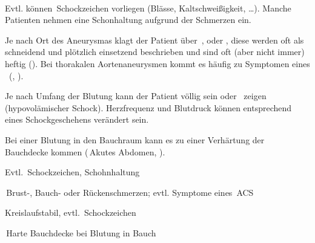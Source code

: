 
\TextSlide
{\TxABCDE}
{~
\begin{ABCDEText}
  \item[\ABCDE{2}] Evtl. können
  {\RedFlag\,}Schockzeichen vorliegen (Blässe, Kaltschweißigkeit,
  \ldots).
  Manche Patienten nehmen eine Schonhaltung aufgrund der
  Schmerzen ein.
  \item[\ABCDE{4}] Je nach Ort des
  Aneurysmas klagt der Patient über {\RedFlag\,}, 
  oder , diese werden oft als schneidend
  und plötzlich einsetzend beschrieben und sind oft (aber nicht immer) heftig
  (). Bei thorakalen
  Aortenaneurysmen kommt es häufig zu Symptomen eines
  {\RedFlag\,} (, ).
  \item[\ABCDE{C}] Je nach Umfang der Blutung kann
  der Patient völlig  sein oder
  {\RedFlag\,} zeigen (hypovolämischer Schock).
  Herzfrequenz und Blutdruck können entsprechend eines
  Schockgeschehens verändert sein.
  \item[\ABCDE{E}] Bei einer Blutung in den Bauchraum 
  kann es zu einer Verhärtung 
  der Bauchdecke kommen ({\RedFlag\,}Akutes Abdomen, 
  ). 
\end{ABCDEText}
}
{
\begin{ABCDESlide}
  \item[\ABCDE{2}] Evtl. {\RedFlag\,}Schockzeichen, Schohnhaltung
  \item[\ABCDE{4}] {\RedFlag\,}Brust-, Bauch- oder Rückenschmerzen;
  evtl. Symptome eines {\RedFlag\,}ACS
  \item[\ABCDE{C}] Kreislaufstabil, evtl. {\RedFlag\,}Schockzeichen
  \item[\ABCDE{E}] {\RedFlag\,}Harte Bauchdecke bei Blutung in Bauch
\end{ABCDESlide}
}
{}
{}
{}

